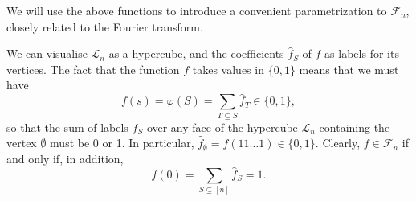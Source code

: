 \documentclass[12pt]{article}
\newtheorem{lemma}{Lemma}
\theoremstyle{definition}
\theoremstyle{remark}
\newtheorem{remark}{Remark}
\def\Fe{\mathcal F}
\def\<{\langle\,}
\def\>{\,\rangle}
\begin{document}
We will use the above functions to introduce  a convenient  parametrization to $\Fe_n$,
closely related to the Fourier transform. 



%
%
%
%
%
%
%
%
%

 We can  visualise $\mathcal L_n$ as a hypercube, and the coefficients $\hat f_S$ of  $f$ as labels for its vertices.
The fact that the function $f$ takes  values in $\{0,1\}$ means that we must have 
\[
f(s)=\varphi(S)=\sum_{T\subseteq S} \hat f_T\in \{0,1\},
\]
so that  the sum of labels $\hat f_S$ over any face of the hypercube $\mathcal L_n$ containing the vertex 
$\emptyset$ must
be 0 or 1. In particular, $\hat f_\emptyset=f(11\dots 1)\in \{0,1\}$. Clearly,  $f\in
\Fe_n$ if and only if,  in addition,
\[
f(0)=\sum_{S\subseteq [n]}\hat f_S=1.
\]
\end{document}
